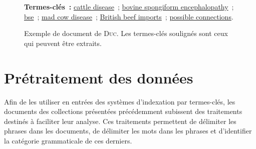 \begin{figure}[!h]
{{          \textbf{Termes-clés~:} \underline{cattle disease}~; \underline{bovine
          spongiform encephalopathy}~; \underline{bse}~; \underline{mad cow
          disease}~; \underline{British beef imports}~; \underline{possible
          connections}.
        }
      }
      \caption[Exemple de document de \textsc{Duc}]{
        Exemple de document de \textsc{Duc}. Les termes-clés soulignés sont ceux
        qui peuvent être extraits.
        \label{fig:example_duc}
      }
    \end{figure}
%
%
%          
%


  \section{Prétraitement des données}
  \label{sec:main-data_description-preprocessing}
    Afin de les utiliser en entrées des systèmes d'indexation par termes-clés,
    les documents des collections présentées précédemment subissent des
    traitements destinés à faciliter leur analyse. Ces traitements permettent de
    délimiter les phrases dans les documents, de délimiter les mots dans les
    phrases et d'identifier la catégorie grammaticale de ces derniers.

